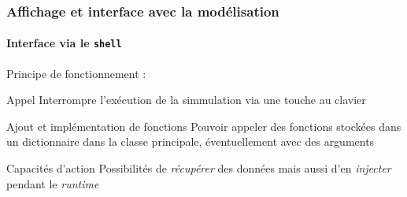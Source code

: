 \begin{frame}
	\frametitle{Affichage et interface avec la modélisation}
	\framesubtitle{Interface via le \texttt{shell}}
    Principe de fonctionnement : 
    \pause
    \begin{exampleblock}{Appel}
        Interrompre l'exécution de la simmulation via une touche au clavier
    \end{exampleblock}
    \pause
    \begin{block}{Ajout et implémentation de fonctions}
        Pouvoir appeler des fonctions stockées dans un dictionnaire dans la classe principale, éventuellement avec des arguments
    \end{block}
    \pause
    \begin{alertblock}{Capacités d'action}
        Possibilités de \textit{récupérer} des données mais aussi d'en \textit{injecter} pendant le \textit{runtime}
    \end{alertblock}
 
\end{frame}
